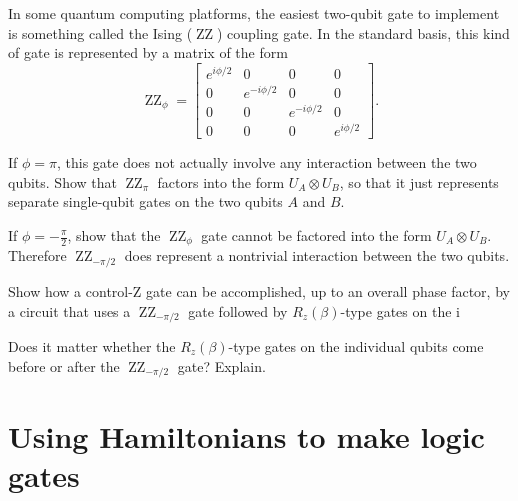 \documentclass{../phys084}
\DeclareMathOperator{\ising}{ZZ}
\begin{document}
\begin{exercise}
  In some quantum computing platforms, the easiest two-qubit gate to
  implement is something called the Ising (\(\ising\)) coupling gate.
  In the standard basis, this kind of gate is represented by a matrix
  of the form
  \[
    \ising_\phi =
    \begin{bmatrix}
      e^{i\phi/2} & 0 & 0 & 0 \\
      0 & e^{-i\phi/2} & 0 & 0 \\
      0 & 0 & e^{-i\phi/2} & 0 \\
      0 & 0 & 0 & e^{i\phi/2}
    \end{bmatrix}.
  \]
  \begin{problems}
  \item If \(\phi = \pi\), this gate does not actually involve any
    interaction between the two qubits.  Show that \(\ising_\pi\)
    factors into the form \(U_A \otimes U_B\), so that it just
    represents separate single-qubit gates on the two qubits \(A\) and
    \(B\).

  \item If \(\phi = -\frac \pi 2\), show that the \(\ising_\phi\) gate
    cannot be factored into the form \(U_A \otimes U_B\).  Therefore
    \(\ising_{-\pi/2}\) does represent a nontrivial interaction
    between the two qubits.

  \item Show how a control-Z gate can be accomplished, up to an
    overall phase factor, by a circuit that uses a \(\ising_{-\pi/2}\)
    gate followed by \(R_z(\beta)\)-type gates on the i

  \item Does it matter whether the \(R_z(\beta)\)-type gates on the
    individual qubits come before or after the \(\ising_{-\pi/2}\)
    gate?  Explain.
  \end{problems}
\end{exercise}

\begin{solution}
  \begin{problems}
  \item
  \item
  \item
  \item
  \end{problems}
\end{solution}

\section{Using Hamiltonians to make logic gates}
\end{document}
